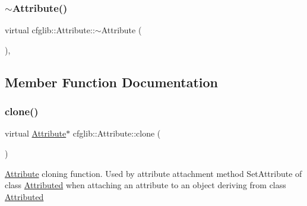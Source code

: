 \subsubsection{\texorpdfstring{$\sim$\+Attribute()}{~Attribute()}}
{\footnotesize\ttfamily virtual cfglib\+::\+Attribute\+::$\sim$\+Attribute (\begin{DoxyParamCaption}{ }\end{DoxyParamCaption})\hspace{0.3cm}{\ttfamily [inline]}, {\ttfamily [virtual]}}



\subsection{Member Function Documentation}
\mbox{\label{classcfglib_1_1Attribute_a107366042fdafe881215426059fec3f8}} 
\subsubsection{\texorpdfstring{clone()}{clone()}\hspace{0.1cm}{\footnotesize\ttfamily [1/2]}}
{\footnotesize\ttfamily virtual \hyperlink{classcfglib_1_1Attribute}{Attribute}$\ast$ cfglib\+::\+Attribute\+::clone (\begin{DoxyParamCaption}{ }\end{DoxyParamCaption})\hspace{0.3cm}{\ttfamily [pure virtual]}}

\hyperlink{classcfglib_1_1Attribute}{Attribute} cloning function. Used by attribute attachment method Set\+Attribute of class \hyperlink{classcfglib_1_1Attributed}{Attributed} when attaching an attribute to an object deriving from class \hyperlink{classcfglib_1_1Attributed}{Attributed} 

